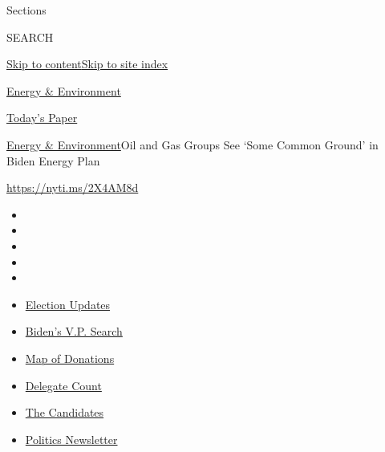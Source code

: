 Sections

SEARCH

\protect\hyperlink{site-content}{Skip to
content}\protect\hyperlink{site-index}{Skip to site index}

\href{https://www.nytimes3xbfgragh.onion/section/business/energy-environment}{Energy
\& Environment}

\href{https://myaccount.nytimes3xbfgragh.onion/auth/login?response_type=cookie\&client_id=vi}{}

\href{https://www.nytimes3xbfgragh.onion/section/todayspaper}{Today's
Paper}

\href{/section/business/energy-environment}{Energy \&
Environment}\textbar{}Oil and Gas Groups See `Some Common Ground' in
Biden Energy Plan

\url{https://nyti.ms/2X4AM8d}

\begin{itemize}
\item
\item
\item
\item
\item
\end{itemize}

\begin{itemize}
\item
  \href{https://www.nytimes3xbfgragh.onion/2020/07/31/us/elections/biden-vs-trump.html?action=click\&pgtype=Article\&state=default\&region=TOP_BANNER\&context=storylines_menu}{Election
  Updates}
\item
  \href{https://www.nytimes3xbfgragh.onion/article/biden-vice-president-2020.html?action=click\&pgtype=Article\&state=default\&region=TOP_BANNER\&context=storylines_menu}{Biden's
  V.P. Search}
\item
  \href{https://www.nytimes3xbfgragh.onion/interactive/2020/07/24/us/politics/trump-biden-campaign-donors.html?action=click\&pgtype=Article\&state=default\&region=TOP_BANNER\&context=storylines_menu}{Map
  of Donations}
\item
  \href{https://www.nytimes3xbfgragh.onion/interactive/2020/us/elections/delegate-count-primary-results.html?action=click\&pgtype=Article\&state=default\&region=TOP_BANNER\&context=storylines_menu}{Delegate
  Count}
\item
  \href{https://www.nytimes3xbfgragh.onion/interactive/2019/us/politics/2020-presidential-candidates.html?action=click\&pgtype=Article\&state=default\&region=TOP_BANNER\&context=storylines_menu}{The
  Candidates}
\item
  \href{https://www.nytimes3xbfgragh.onion/newsletters/politics?action=click\&pgtype=Article\&state=default\&region=TOP_BANNER\&context=storylines_menu}{Politics
  Newsletter}
\end{itemize}


